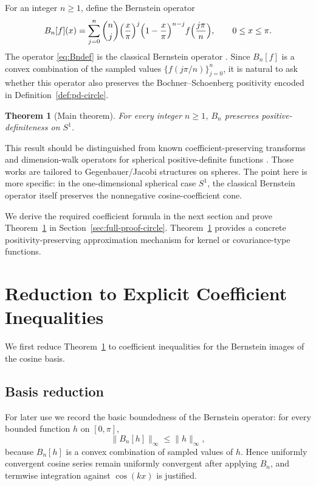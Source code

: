 \documentclass[a4paper,12pt]{amsart}
\newtheorem{theorem}{Theorem}[section]
\theoremstyle{definition}
\theoremstyle{remark}
\begin{document}
For an integer $n\ge 1$, define the Bernstein operator
\begin{equation}
\label{eq:Bndef}
B_n[f](x)=\sum_{j=0}^{n}\binom{n}{j}
\Bigl(\frac{x}{\pi}\Bigr)^j\Bigl(1-\frac{x}{\pi}\Bigr)^{n-j}
f\Bigl(\frac{j\pi}{n}\Bigr), \qquad 0 \le x\le \pi.
\end{equation}
The operator \eqref{eq:Bndef} is the classical Bernstein operator \cite{Lorentz1953Bernstein}. Since $B_n[f]$ is a convex combination of the sampled values $\{f(j\pi/n)\}_{j=0}^n$, it is natural to ask whether this operator also preserves the Bochner--Schoenberg positivity encoded in Definition~\ref{def:pd-circle}. 



\begin{theorem}[Main theorem]\label{thm:main}
For every integer $n\ge 1$, $B_n$ preserves positive-definiteness on $S^1$.
\end{theorem}

This result should be distinguished from known coefficient-preserving transforms and dimension-walk operators for spherical positive-definite functions \cite{BeatsonZuCastell2016,BeatsonZuCastell2017,Xu2017Jacobi,MassaPeronPorcu2017}. Those works are tailored to Gegenbauer/Jacobi structures on spheres. The point here is more specific: in the one-dimensional spherical case $S^1$, the classical Bernstein operator itself preserves the nonnegative cosine-coefficient cone.



We derive the required coefficient formula in the next section and prove Theorem~\ref{thm:main} in Section~\ref{sec:full-proof-circle}. Theorem~\ref{thm:main} provides a concrete positivity-preserving approximation mechanism for kernel or covariance-type functions.




\section{Reduction to Explicit Coefficient Inequalities}
We first reduce Theorem~\ref{thm:main} to coefficient inequalities for the
Bernstein images of the cosine basis.


\subsection{Basis reduction}
For later use we record the basic boundedness of the Bernstein operator: for every bounded function $h$ on $[0,\pi]$,
\[
\|B_n[h]\|_\infty\le \|h\|_\infty,
\]
because $B_n[h]$ is a convex combination of sampled values of $h$. Hence uniformly convergent cosine series remain uniformly convergent after applying $B_n$, and termwise integration against $\cos(kx)$ is justified.
\end{document}
